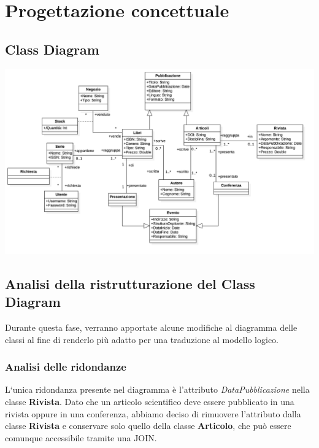 \chapter{Progettazione concettuale}
    \section{Class Diagram}

    \includegraphics[scale=0.15]{Immagini/SchemaConcettuale.png}
        
    \section{Analisi della ristrutturazione del Class Diagram}
    Durante questa fase, verranno apportate alcune modifiche al diagramma delle 
    classi al fine di renderlo pi\`u adatto per una traduzione al modello logico.
        \subsection{Analisi delle ridondanze}
        L`unica ridondanza presente nel diagramma \`e l'attributo \textit{DataPubblicazione} nella 
        classe \textbf{Rivista}. Dato che un articolo scientifico deve essere pubblicato in una rivista oppure in una conferenza,
        abbiamo deciso di rimuovere l'attributo dalla classe \textbf{Rivista} e conservare solo quello della classe 
        \textbf{Articolo}, che pu\`o essere comunque accessibile tramite una JOIN.
